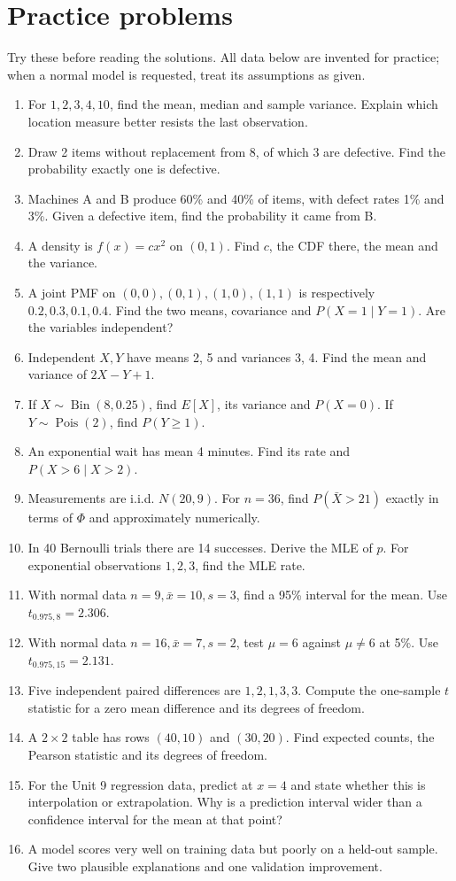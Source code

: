 \section{Practice problems}
Try these before reading the solutions. All data below are invented for
practice; when a normal model is requested, treat its assumptions as given.
\begin{enumerate}
\item For $1,2,3,4,10$, find the mean, median and sample variance. Explain
which location measure better resists the last observation.
\item Draw 2 items without replacement from 8, of which 3 are defective.
Find the probability exactly one is defective.
\item Machines A and B produce 60\% and 40\% of items, with defect rates
1\% and 3\%. Given a defective item, find the probability it came from B.
\item A density is $f(x)=cx^2$ on $(0,1)$. Find $c$, the CDF there, the mean
and the variance.
\item A joint PMF on $(0,0),(0,1),(1,0),(1,1)$ is respectively
$0.2,0.3,0.1,0.4$. Find the two means, covariance and $P(X=1\mid Y=1)$.
Are the variables independent?
\item Independent $X,Y$ have means 2, 5 and variances 3, 4. Find the mean
and variance of $2X-Y+1$.
\item If $X\sim\operatorname{Bin}(8,0.25)$, find $E[X]$, its variance and
$P(X=0)$. If $Y\sim\operatorname{Pois}(2)$, find $P(Y\geq1)$.
\item An exponential wait has mean 4 minutes. Find its rate and
$P(X>6\mid X>2)$.
\item Measurements are i.i.d. $N(20,9)$. For $n=36$, find
$P(\bar X>21)$ exactly in terms of $\Phi$ and approximately numerically.
\item In 40 Bernoulli trials there are 14 successes. Derive the MLE of $p$.
For exponential observations $1,2,3$, find the MLE rate.
\item With normal data $n=9,\bar x=10,s=3$, find a 95\% interval for the mean.
Use $t_{0.975,8}=2.306$.
\item With normal data $n=16,\bar x=7,s=2$, test $\mu=6$ against $\mu\ne6$
at 5\%. Use $t_{0.975,15}=2.131$.
\item Five independent paired differences are $1,2,1,3,3$. Compute the
one-sample $t$ statistic for a zero mean difference and its degrees of freedom.
\item A $2\times2$ table has rows $(40,10)$ and $(30,20)$. Find expected
counts, the Pearson statistic and its degrees of freedom.
\item For the Unit 9 regression data, predict at $x=4$ and state whether
this is interpolation or extrapolation. Why is a prediction interval wider
than a confidence interval for the mean at that point?
\item A model scores very well on training data but poorly on a held-out
sample. Give two plausible explanations and one validation improvement.
\end{enumerate}

